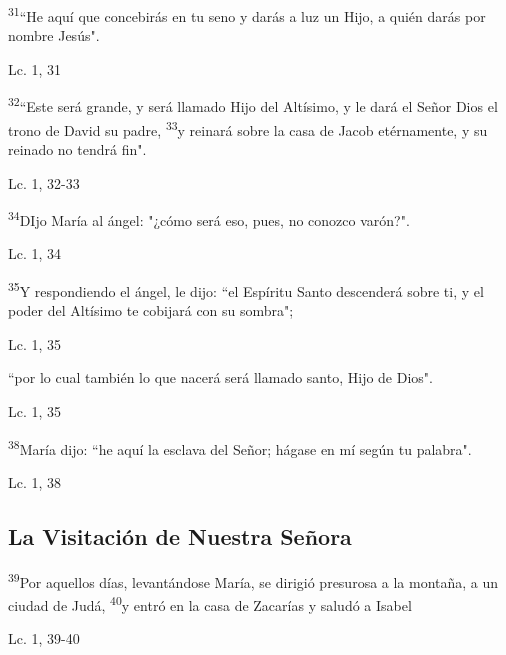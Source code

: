 \documentclass[a4paper,11pt]{article}
\begin{document}
      \textsuperscript{31}``He aquí que concebirás en tu seno y darás a luz un Hijo, a quién darás por nombre Jesús".
      \begin{flushright}
        Lc. 1, 31
      \end{flushright}
      \medskip

      \textsuperscript{32}``Este será grande, y será llamado Hijo del Altísimo, y le dará el Señor Dios el trono de David su padre, \textsuperscript{33}y reinará
      sobre la casa de Jacob etérnamente, y su reinado no tendrá fin".
      \begin{flushright}
        Lc. 1, 32-33
      \end{flushright}
      \medskip

      \textsuperscript{34}DIjo María al ángel: "¿cómo será eso, pues, no conozco varón?".
      \begin{flushright}
        Lc. 1, 34
      \end{flushright}
      \medskip
      
      \textsuperscript{35}Y respondiendo el ángel, le dijo: ``el Espíritu Santo descenderá sobre ti, y el poder del Altísimo te cobijará con su sombra";
      \begin{flushright}
        Lc. 1, 35
      \end{flushright}
      \medskip

      ``por lo cual también lo que nacerá será llamado santo, Hijo de Dios".
      \begin{flushright}
        Lc. 1, 35
      \end{flushright}
      \medskip

      \textsuperscript{38}María dijo: ``he aquí la esclava del Señor; hágase en mí según tu palabra".
      \begin{flushright}
        Lc. 1, 38
      \end{flushright}
      \medskip
            
    \subsection*{\hfil La Visitación de Nuestra Señora \hfil}
      
      \textsuperscript{39}Por aquellos días, levantándose María, se dirigió presurosa a la montaña, a un ciudad de Judá, \textsuperscript{40}y entró en la casa
      de Zacarías y saludó a Isabel
      \begin{center}
        Lc. 1, 39-40        
      \end{center}
      
\end{document}
